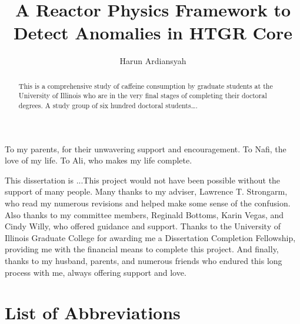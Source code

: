 \documentclass{uiucthesis2021}
\begin{document}
\title{A Reactor Physics Framework to Detect Anomalies in HTGR Core}
\author{Harun Ardiansyah}
\phdthesis
{}
\maketitle

\frontmatter

\begin{abstract}
This is a comprehensive study of caffeine consumption by graduate
students at the University of Illinois who are in the very final
stages of completing their doctoral degrees. A study group of six
hundred doctoral students\ldots.
\end{abstract}

\begin{dedication}
To my parents, for their unwavering support and encouragement. To Nafi, the love of my life. To Ali, who makes my life complete.
\end{dedication}

\begin{acknowledgments}
This dissertation is ...This project would not have been possible without the support of
many people. Many thanks to my adviser, Lawrence T. Strongarm, who
read my numerous revisions and helped make some sense of the
confusion. Also thanks to my committee members, Reginald Bottoms,
Karin Vegas, and Cindy Willy, who offered guidance and support.
Thanks to the University of Illinois Graduate College for awarding
me a Dissertation Completion Fellowship, providing me with the
financial means to complete this project. And finally, thanks to
my husband, parents, and numerous friends who endured this long
process with me, always offering support and love.
\end{acknowledgments}

{
    \hypersetup{linkcolor=black}  %
    \tableofcontents
}

\chapter{List of Abbreviations}
\end{document}
